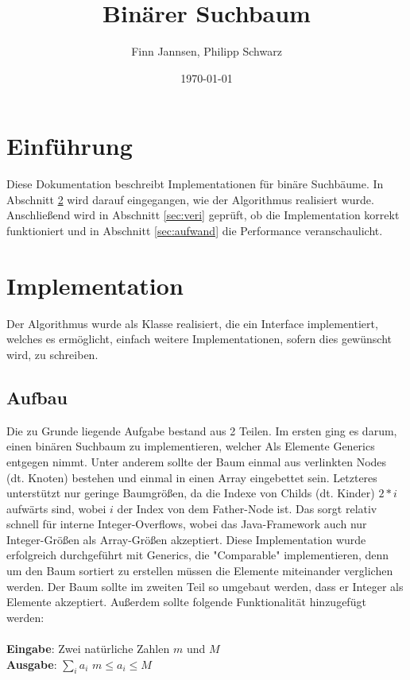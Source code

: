 \documentclass[11pt]{scrartcl}
\title{Binärer Suchbaum}
\author{Finn Jannsen, Philipp Schwarz}
\date{\today{}}
\begin{document}
\maketitle

\tableofcontents

\section{Einführung}
	\label{sec:einfuehrung}
	
	Diese Dokumentation beschreibt Implementationen für binäre Suchbäume.
	In Abschnitt \ref{sec:implementation} wird darauf eingegangen, wie der Algorithmus realisiert wurde.
	Anschließend wird in Abschnitt \ref{sec:veri} geprüft, ob die Implementation korrekt funktioniert 
	und in Abschnitt \ref{sec:aufwand} die Performance veranschaulicht.

\section{Implementation}
	\label{sec:implementation}
	
	Der Algorithmus wurde als Klasse realisiert, die ein Interface implementiert, welches es ermöglicht, einfach weitere Implementationen, sofern dies gewünscht wird, zu schreiben.
	
	\subsection{Aufbau}
		\label{sec:codeStruc}
		
		Die zu Grunde liegende Aufgabe bestand aus 2 Teilen. Im ersten ging es darum, einen binären Suchbaum zu implementieren, welcher Als Elemente Generics entgegen nimmt.
		Unter anderem sollte der Baum einmal aus verlinkten Nodes (dt. Knoten) bestehen und einmal in einen Array eingebettet sein. Letzteres unterstützt nur geringe Baumgrößen, da die Indexe von Childs (dt. Kinder) $2*i$ aufwärts sind, wobei $i$ der Index von dem Father-Node ist. 
		Das sorgt relativ schnell für interne Integer-Overflows, wobei das Java-Framework auch nur Integer-Größen als Array-Größen akzeptiert.
		Diese Implementation wurde erfolgreich durchgeführt mit Generics, die "Comparable" implementieren, denn um den Baum sortiert zu erstellen müssen die Elemente miteinander verglichen werden.
		Der Baum sollte im zweiten Teil so umgebaut werden, dass er Integer als Elemente akzeptiert. Außerdem sollte folgende Funktionalität hinzugefügt werden:\\\\
		\textbf{Eingabe}: Zwei natürliche Zahlen $m$ und $M$\\
		\textbf{Ausgabe}: $\sum_{i}a_i$ $m \leq a_i \leq M$\\
\end{document}
